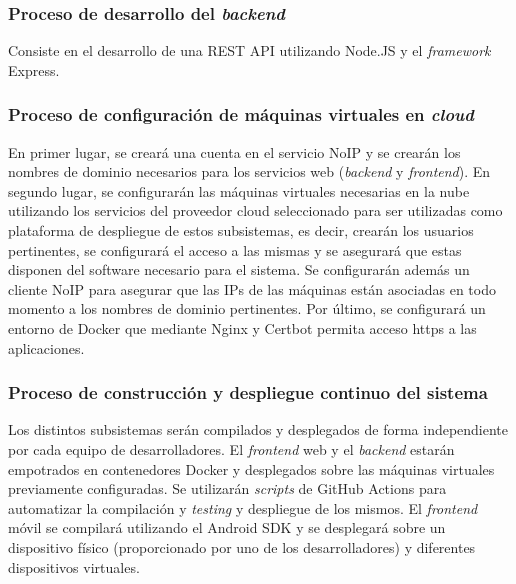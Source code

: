 \documentclass{article}
\begin{document}
\subsubsection{Proceso de desarrollo del \textit{backend}} \label{P.T.4}
Consiste en el desarrollo de una REST API utilizando Node.JS y el \textit{framework} Express.

\subsubsection{Proceso de configuración de máquinas virtuales en \textit{cloud}} \label{P.T.5}

En primer lugar, se creará una cuenta en el servicio NoIP y se crearán los nombres de dominio necesarios para los servicios web (\textit{backend} y \textit{frontend}). En segundo lugar, se configurarán las máquinas virtuales necesarias en la nube utilizando los servicios del proveedor cloud seleccionado para ser utilizadas como plataforma de despliegue de estos subsistemas, es decir, crearán los usuarios pertinentes, se configurará el acceso a las mismas y se asegurará que estas disponen del software necesario para el sistema. Se configurarán además un cliente NoIP para asegurar que las IPs de las máquinas están asociadas en todo momento a los nombres de dominio pertinentes. Por último, se configurará un entorno de Docker que mediante Nginx y Certbot permita acceso https a las aplicaciones. 

\subsubsection{Proceso de construcción y despliegue continuo del sistema} \label{P.T.6}
Los distintos subsistemas serán compilados y desplegados de forma independiente por cada equipo de desarrolladores.
El \textit{frontend} web y el \textit{backend} estarán empotrados en contenedores Docker y desplegados sobre las máquinas virtuales previamente configuradas. Se utilizarán \textit{scripts} de GitHub Actions para automatizar la compilación y \textit{testing} y despliegue de los mismos. El \textit{frontend} móvil se compilará utilizando el Android SDK y se desplegará sobre un dispositivo físico (proporcionado por uno de los desarrolladores) y diferentes dispositivos virtuales.

\pagebreak

\end{document}
